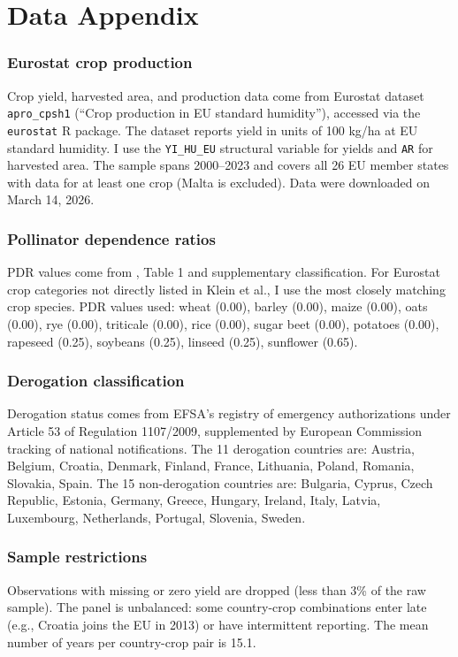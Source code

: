 \documentclass[12pt]{article}
\begin{document}
\label{apep_main_text_end}
\newpage


\newpage
\appendix

\section{Data Appendix}

\subsubsection*{Eurostat crop production} Crop yield, harvested area, and production data come from Eurostat dataset \texttt{apro\_cpsh1} (``Crop production in EU standard humidity''), accessed via the \texttt{eurostat} R package. The dataset reports yield in units of 100 kg/ha at EU standard humidity. I use the \texttt{YI\_HU\_EU} structural variable for yields and \texttt{AR} for harvested area. The sample spans 2000--2023 and covers all 26 EU member states with data for at least one crop (Malta is excluded). Data were downloaded on March 14, 2026.

\subsubsection*{Pollinator dependence ratios} PDR values come from \citet{klein2007importance}, Table 1 and supplementary classification. For Eurostat crop categories not directly listed in Klein et al., I use the most closely matching crop species. PDR values used: wheat (0.00), barley (0.00), maize (0.00), oats (0.00), rye (0.00), triticale (0.00), rice (0.00), sugar beet (0.00), potatoes (0.00), rapeseed (0.25), soybeans (0.25), linseed (0.25), sunflower (0.65).

\subsubsection*{Derogation classification} Derogation status comes from EFSA's registry of emergency authorizations under Article 53 of Regulation 1107/2009, supplemented by European Commission tracking of national notifications. The 11 derogation countries are: Austria, Belgium, Croatia, Denmark, Finland, France, Lithuania, Poland, Romania, Slovakia, Spain. The 15 non-derogation countries are: Bulgaria, Cyprus, Czech Republic, Estonia, Germany, Greece, Hungary, Ireland, Italy, Latvia, Luxembourg, Netherlands, Portugal, Slovenia, Sweden.

\subsubsection*{Sample restrictions} Observations with missing or zero yield are dropped (less than 3\% of the raw sample). The panel is unbalanced: some country-crop combinations enter late (e.g., Croatia joins the EU in 2013) or have intermittent reporting. The mean number of years per country-crop pair is 15.1.
\end{document}
